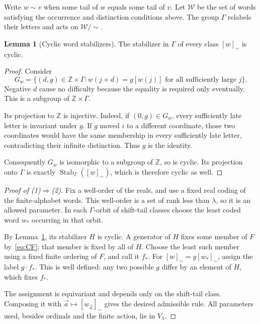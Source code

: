 \documentclass[11pt,letterpaper]{article}
\theoremstyle{definition}
\newtheorem{lemma}[definition]{Lemma}
\numberwithin{equation}{section}
\newcommand{\Stab}{\operatorname{Stab}}
\begin{document}
Write $w\sim v$ when some tail of $w$ equals some tail of $v$. Let $\mathcal W$ be the set of words satisfying the occurrence and distinction conditions above. The group $\Gamma$ relabels their letters and acts on $\mathcal W/{\sim}$.

\begin{lemma}[Cyclic word stabilizers]\label{lem:cyclic}
The stabilizer in $\Gamma$ of every class $[w]_\sim$ is cyclic.
\end{lemma}
\begin{proof}
Consider
\[
G_w=\{(d,g)\in\mathbb Z\times\Gamma:
          w(j+d)=g[w(j)]\text{ for all sufficiently large }j\}.
\]
Negative $d$ cause no difficulty because the equality is required only eventually. This is a subgroup of $\mathbb Z\times\Gamma$.

Its projection to $\mathbb Z$ is injective. Indeed, if $(0,g)\in G_w$, every sufficiently late letter is invariant under $g$. If $g$ moved $i$ to a different coordinate, those two coordinates would have the same membership in every sufficiently late letter, contradicting their infinite distinction. Thus $g$ is the identity.

Consequently $G_w$ is isomorphic to a subgroup of $\mathbb Z$, so is cyclic. Its projection onto $\Gamma$ is exactly $\Stab_\Gamma([w]_\sim)$, which is therefore cyclic as well.
\end{proof}

\begin{proof}[Proof of (1)$\Rightarrow$(2)]
Fix a well-order of the reals, and use a fixed real coding of the finite-alphabet words. This well-order is a set of rank less than $\lambda$, so it is an allowed parameter. In each $\Gamma$-orbit of shift-tail classes choose the least coded word $w_*$ occurring in that orbit.

By Lemma~\ref{lem:cyclic}, its stabilizer $H$ is cyclic. A generator of $H$ fixes some member of $F$ by~\eqref{eq:CF}; that member is fixed by all of $H$. Choose the least such member using a fixed finite ordering of $F$, and call it $f_*$. For $[w]_\sim=g[w_*]_\sim$, assign the label $g\cdot f_*$. This is well defined: any two possible $g$ differ by an element of $H$, which fixes $f_*$.

The assignment is equivariant and depends only on the shift-tail class. Composing it with $\vec a\mapsto[w_{\vec a}]_\sim$ gives the desired admissible rule. All parameters used, besides ordinals and the finite action, lie in $V_\lambda$.
\end{proof}
\end{document}
